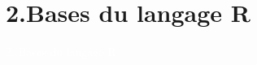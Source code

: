 \documentclass[11pt]{beamer}\usepackage[]{graphicx}\usepackage[]{color}
\makeatletter
\newcommand{\hlnum}[1]{\textcolor[rgb]{0.063,0.58,0.627}{#1}}%
\newcommand{\hlstr}[1]{\textcolor[rgb]{0.063,0.58,0.627}{#1}}%
\newcommand{\hlcom}[1]{\textcolor[rgb]{0.588,0.588,0.588}{#1}}%
\newcommand{\hlopt}[1]{\textcolor[rgb]{0.196,0.196,0.196}{#1}}%
\newcommand{\hlstd}[1]{\textcolor[rgb]{0.196,0.196,0.196}{#1}}%
\newcommand{\hlkwb}[1]{\textcolor[rgb]{0.627,0,0.314}{#1}}%
\newcommand{\hlkwc}[1]{\textcolor[rgb]{0,0.631,0.314}{#1}}%
\newcommand{\hlkwd}[1]{\textcolor[rgb]{0.78,0.227,0.412}{#1}}%
\newenvironment{kframe}{%
 \def\at@end@of@kframe{}%
 \ifinner\ifhmode%
  \def\at@end@of@kframe{\end{minipage}}%
  \begin{minipage}{\columnwidth}%
 \fi\fi%
 \def\FrameCommand##1{\hskip\@totalleftmargin \hskip-\fboxsep
 \colorbox{shadecolor}{##1}\hskip-\fboxsep
     \hskip-\linewidth \hskip-\@totalleftmargin \hskip\columnwidth}%
 \MakeFramed {\advance\hsize-\width
   \@totalleftmargin\z@ \linewidth\hsize
   \@setminipage}}%
 {\par\unskip\endMakeFramed%
 \at@end@of@kframe}
\newenvironment{knitrout}{}{} %
\newtheorem{rcode}{R code}[section]
\makeatother
\begin{document}

\section{2.Bases du langage R}

\begin{frame}[plain]
\hspace*{-1.0cm}\parbox[t]{\textwidth}{
 \begin{center}
  \Huge{\textcolor{white}{2. Bases du langage R}}
 \end{center}
 }
\end{frame}
\end{document}
